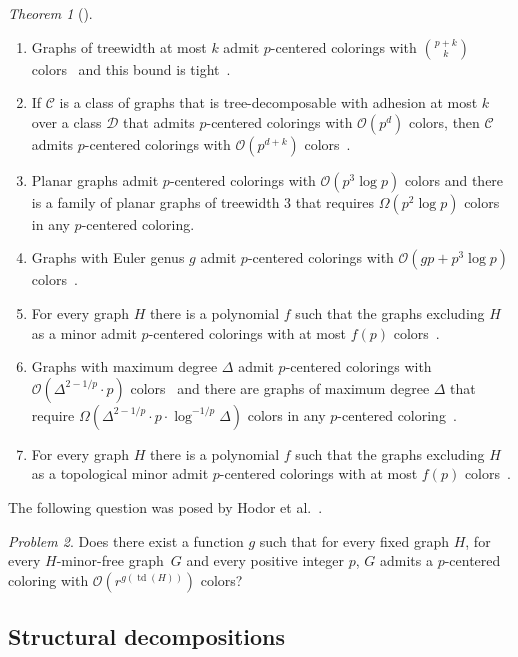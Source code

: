 \documentclass[1p,number,a4paper]{elsarticle}
\theoremstyle{remark}
\newcommand{\Oof}{\mathcal{O}}
\newcommand{\Cc}{\mathscr{C}}
\newcommand{\Dd}{\mathscr{D}}
\DeclareMathOperator{\td}{td}
\newtheorem{theorem}{Theorem}[section]
\newtheorem{problem}[theorem]{Problem}
\begin{document}
\begin{theorem}[\cite{debski2020improved,dubois2020two,pilipczuk2019polynomial}]
  \mbox{}
  \begin{enumerate}
    \item Graphs of treewidth at most $k$ admit $p$-centered colorings with $\binom{p+k}{k}$ colors~\cite{pilipczuk2019polynomial} and this bound is tight~\cite{debski2020improved}. 
    \item If $\Cc$ is a class of graphs that is tree-decomposable with adhesion at most $k$ over a class $\Dd$ that admits $p$-centered colorings with $\Oof(p^d)$ colors, then $\Cc$ admits $p$-centered colorings with $\Oof(p^{d+k})$ colors~\cite{pilipczuk2019polynomial}. 
    \item Planar graphs admit $p$-centered colorings with $\Oof(p^3\log p)$ colors and there is a family of planar graphs of treewidth $3$ that requires $\Omega(p^2\log p)$ colors in any $p$-centered coloring. 
    \item Graphs with Euler genus $g$ admit $p$-centered colorings with $\Oof(gp+p^3\log p)$ colors~\cite{debski2020improved}. 
    \item For every graph $H$ there is a polynomial $f$ such that the graphs excluding $H$ as a minor admit $p$-centered colorings with at most $f(p)$ colors~\cite{pilipczuk2019polynomial}.
    \item Graphs with maximum degree $\Delta$ admit $p$-centered colorings with $\Oof(\Delta^{2-1/p}\cdot p)$ colors~\cite{debski2020improved} and  there are graphs of maximum degree $\Delta$ that require $\Omega(\Delta^{2-1/p}\cdot p\cdot \log^{-1/p}\Delta)$ colors in any $p$-centered coloring~\cite{dubois2020two}. 
    \item For every graph $H$ there is a polynomial $f$ such that the graphs excluding $H$ as a topological minor admit $p$-centered colorings with at most $f(p)$ colors~\cite{debski2020improved}. 
  \end{enumerate}
\end{theorem}

The following question was posed by Hodor et al.~\cite{hodor2024weak}.
\begin{problem}
  Does there exist a function $g$ such that for every fixed graph $H$, for every $H$-minor-free graph~$G$ and every positive integer $p$, $G$ admits a $p$-centered coloring with $\Oof(r^{g(\td(H))})$ colors?
\end{problem}

\subsection{Structural decompositions}\label{sec:structural-decompos}
\end{document}
